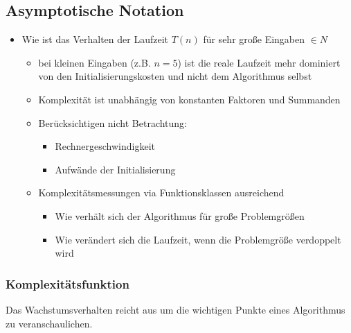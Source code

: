 	\subsection{Asymptotische Notation}
		\begin{itemize}
			\item Wie ist das Verhalten der Laufzeit $T(n)$ für sehr gro\ss e Eingaben $  \in N$
			\begin{itemize}
				\item bei kleinen Eingaben (z.B. $n = 5$) ist die reale Laufzeit mehr dominiert 
					von den Initialisierungskosten und nicht dem Algorithmus selbst
					\item Komplexität ist unabhängig von konstanten Faktoren und Summanden
				\item Berücksichtigen nicht Betrachtung:
				\begin{itemize}
					\item Rechnergeschwindigkeit
					\item Aufwände der Initialisierung
				\end{itemize}
				\item Komplexitätsmessungen via Funktionsklassen ausreichend
				\begin{itemize}
					\item Wie verhält sich der Algorithmus für gro\ss e Problemgrö\ss en
					\item Wie verändert sich die Laufzeit, wenn die Problemgrö\ss e verdoppelt wird
				\end{itemize}
			\end{itemize}
		\end{itemize}

		\subsubsection{Komplexitätsfunktion}
			Das Wachstumsverhalten reicht aus um die wichtigen Punkte eines Algorithmus zu veranschaulichen.

